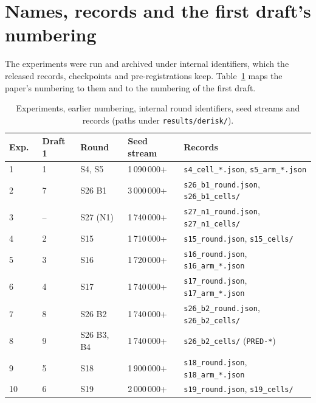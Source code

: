 \documentclass{l4dc2027}
\begin{document}
\section{Names, records and the first draft's numbering}

The experiments were run and archived under internal identifiers, which the released records, checkpoints and pre-registrations keep. Table~\ref{tab:cross} maps the paper's numbering to them and to the numbering of the first draft.

\begin{table}[h]
\centering\footnotesize
\caption{Experiments, earlier numbering, internal round identifiers, seed streams and records (paths under \texttt{results/derisk/}).}\label{tab:cross}
\setlength{\tabcolsep}{3pt}
\begin{tabular}{@{}llllp{5.6cm}@{}}
\toprule
Exp.\ & Draft 1 & Round & Seed stream & Records \\
\midrule
1 & 1 & S4, S5 & 1\,090\,000+ & \texttt{s4\_cell\_*.json}, \texttt{s5\_arm\_*.json} \\
2 & 7 & S26 B1 & 3\,000\,000+ & \texttt{s26\_b1\_round.json}, \texttt{s26\_b1\_cells/} \\
3 & -- & S27 (N1) & 1\,740\,000+ & \texttt{s27\_n1\_round.json}, \texttt{s27\_n1\_cells/} \\
4 & 2 & S15 & 1\,710\,000+ & \texttt{s15\_round.json}, \texttt{s15\_cells/} \\
5 & 3 & S16 & 1\,720\,000+ & \texttt{s16\_round.json}, \texttt{s16\_arm\_*.json} \\
6 & 4 & S17 & 1\,740\,000+ & \texttt{s17\_round.json}, \texttt{s17\_arm\_*.json} \\
7 & 8 & S26 B2 & 1\,740\,000+ & \texttt{s26\_b2\_round.json}, \texttt{s26\_b2\_cells/} \\
8 & 9 & S26 B3, B4 & 1\,740\,000+ & \texttt{s26\_b2\_cells/} (\texttt{PRED-*}) \\
9 & 5 & S18 & 1\,900\,000+ & \texttt{s18\_round.json}, \texttt{s18\_arm\_*.json} \\
10 & 6 & S19 & 2\,000\,000+ & \texttt{s19\_round.json}, \texttt{s19\_cells/} \\
\bottomrule
\end{tabular}
\end{table}
\end{document}

